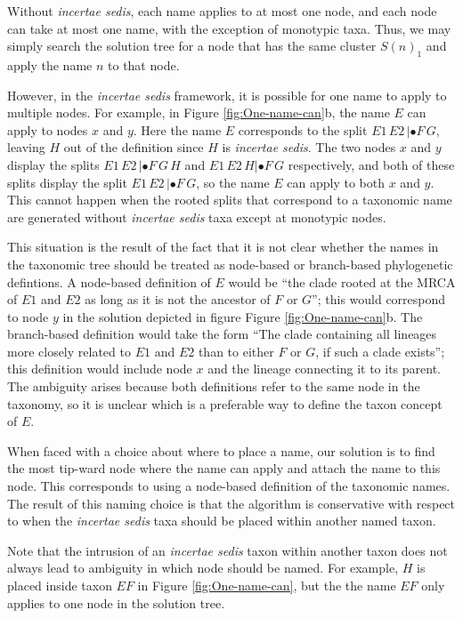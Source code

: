 \documentclass[english]{article}
\begin{document}
Without \emph{incertae sedis}, each name applies to at most one node, and each
node can take at most one name, with the exception of monotypic taxa. Thus, we
may simply search the solution tree for a node that has the same cluster $S(n)_{1}$
and apply the name $n$ to that node.

However, in the \emph{incertae sedis} framework, it is possible for one name to
apply to multiple nodes. For example, in Figure \ref{fig:One-name-can}b, the
name $E$ can apply to nodes $x$ and $y$. Here the name $E$ corresponds to the split
$E1\,E2\,|\bullet F\,G$, leaving $H$ out of the definition since $H$ is \emph{incertae sedis}. 
The two nodes $x$
and $y$ display the splits $E1\,E2\,|\bullet F\,G\,H$ and $E1\,E2\,H|\bullet
F\,G$ respectively, and both
of these splits display the split $E1\,E2\,|\bullet F\,G$, so the name $E$ can apply to both
$x$ and $y$. 
This cannot happen when the rooted splits that correspond to a taxonomic name
    are generated without\emph{ incertae sedis} taxa except at
monotypic nodes.

This situation is the result of the fact that it is not clear whether the names
    in the taxonomic tree should be treated as node-based or branch-based
    phylogenetic defintions.
A node-based definition of $E$ would be ``the clade rooted at the MRCA of $E1$ and $E2$ as long as it is not
    the ancestor of $F$ or $G$''; this would correspond to node $y$ in the solution
    depicted in figure Figure \ref{fig:One-name-can}b.
The branch-based definition would take the form ``The clade containing all lineages more closely related to 
   $E1$ and $E2$ than to either $F$ or $G$, if such a clade exists''; this definition
   would include node $x$ and the lineage connecting it to its parent.
The ambiguity arises because both definitions refer to the same node in the taxonomy,
    so it is unclear which is a preferable way to define the taxon concept of $E$.

When faced with a choice about where to place a name, our
solution is to find the most tip-ward node where the name can apply and attach
the name to this node.
This corresponds to using a node-based definition of the taxonomic names.
The result of this naming choice is that the algorithm is conservative with respect
    to when the \emph{incertae sedis} taxa should be placed within another named
    taxon.

Note that the intrusion of an \emph{incertae sedis} taxon within another taxon does not
    always lead to ambiguity in which node should be named. 
For example, $H$ is placed inside taxon $EF$ in Figure \ref{fig:One-name-can}, but the
    the name $EF$ only applies to one node in the solution tree.
\end{document}
